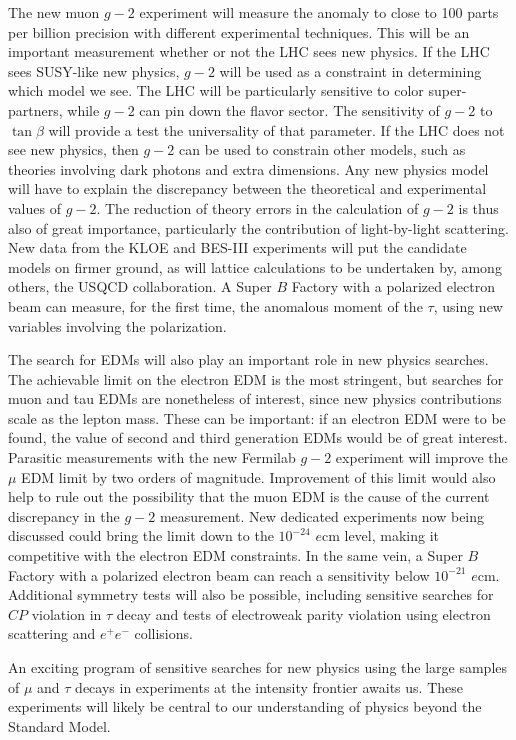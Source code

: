 \documentclass{tcibook}
\begin{document}
The new muon $g\!\!-\!\!2$ experiment will measure the anomaly to close to 100 parts per billion precision
with different experimental techniques. This will be an important measurement whether or not the LHC sees new physics. If the LHC sees SUSY-like new physics, $g\!\!-\!\!2$ will be used as a constraint in determining which model we see. The LHC will be particularly sensitive to color super-partners, while $g\!\!-\!\!2$ can pin down the flavor sector. The sensitivity of $g\!\!-\!\!2$ to $\tan\beta$ will provide a test the universality of that parameter. If the LHC does not see new physics, then $g\!\!-\!\!2$ can be used to constrain other models, such as theories involving dark photons and extra dimensions. Any new physics model will have to explain the discrepancy between the theoretical and experimental values of $g\!\!-\!\!2$.
The reduction of theory errors in the calculation of $g\!\!-\!\!2$ is thus also of great importance, particularly the contribution of light-by-light scattering.  New data from the KLOE and BES-III experiments  will put the candidate models on firmer ground, as will lattice calculations to be undertaken by, among others, the USQCD collaboration. A Super $B$ Factory with a polarized electron beam can measure, for the first time, the anomalous moment of the $\tau$, using new variables involving the polarization.


The search for EDMs will also play an important role in new physics
searches. The achievable limit on the electron EDM is the most stringent, but searches for muon and tau EDMs are nonetheless of interest, since new physics contributions scale as the lepton mass. These can be
important: if an electron EDM were to be found, the value of second and third generation EDMs would be of great interest.  Parasitic measurements with the new Fermilab $g\!\!-\!\!2$ experiment will improve the $\mu$ EDM limit by two
orders of magnitude. Improvement of this limit would also help to rule out
the possibility that the muon EDM is the cause of the current discrepancy in the
$g\!\!-\!\!2$ measurement. New dedicated experiments now being discussed
could bring the limit down to the $10^{-24}$ $e$cm level, making it
competitive with the electron EDM constraints. In the same vein, a Super $B$ Factory with a polarized electron beam can reach a sensitivity below $10^{-21}$ $e$cm.
Additional symmetry tests will also be possible, including sensitive searches for $C\!P$ violation in $\tau$ decay and 
tests of electroweak parity violation using electron scattering and $e^+e^-$ collisions. 

An exciting program of sensitive searches for new physics using the large samples of $\mu$ and $\tau$ decays in experiments at the intensity frontier awaits us. These experiments will likely be central to our understanding of physics beyond the Standard Model.
\end{document}
